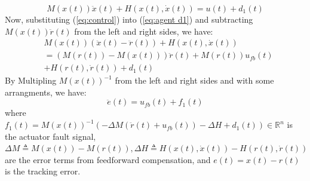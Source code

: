 \documentclass{ieeeaccess}
\begin{document}
\begin{equation} \label{eq:agent d1} 
    M(x(t))\ddot{x}(t) + H(x(t),\dot{x}(t)) = u(t) + d_1(t)
\end{equation}
Now, substituting (\ref{eq:control}) into (\ref{eq:agent d1}) and subtracting $M(x(t))\ddot{r}(t)$ from the left and right sides, we have:
\begin{equation} \label{eq:agent1}
    \begin{split}
        & M(x(t))(\ddot{x}(t)-\ddot{r}(t)) + H(x(t),\dot{x}(t)) \\
        & =(M(r(t))-M(x(t)))\ddot{r}(t) + M(r(t))u_{fb}(t) \\
        & + H(r(t),\dot{r}(t)) + d_1(t)
    \end{split}
\end{equation}
By Multipling $M(x(t))^{-1}$ from the left and right sides and with some arrangments, we have:
\begin{equation} \label{eq:error, state eq}
    \ddot{e}(t) = u_{fb}(t) + f_1(t)
\end{equation}
where $f_1(t) = M(x(t))^{-1}(-\Delta M (\ddot{r}(t)+u_{fb}(t)) -\Delta H + d_1(t))\in\mathbb{R}^n$ is the actuator fault signal, $\Delta M \triangleq M(x(t)) - M(r(t)), \Delta H \triangleq H(x(t),\dot{x}(t)) - H(r(t),\dot{r}(t))$ are the error terms from feedforward compensation, and $e(t)= x(t)-r(t)$ is the tracking error.
\end{document}
